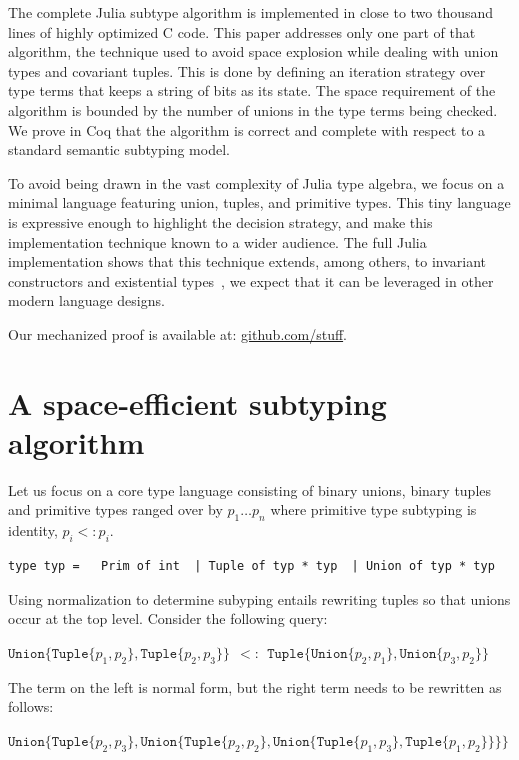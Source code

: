 \documentclass[a4paper,english]{lipics-v2019}
\newcommand{\xt}[1]{\texttt{#1}}
\newcommand{\union}[2]{\xt{Union\{}#1,#2\xt{\}}}
\newcommand{\tuple}[1]{\xt{Tuple\{}#1\xt{\}}}
\begin{document}
The complete Julia subtype algorithm is implemented in close to two thousand
lines of highly optimized C code. This paper addresses only one part of that
algorithm, the technique used to avoid space explosion while dealing with
union types and covariant tuples. This is done by defining an iteration
strategy over type terms that keeps a string of bits as its state. The space
requirement of the algorithm is bounded by the number of unions in the type
terms being checked. We prove in Coq that the algorithm is correct and
complete with respect to a standard semantic subtyping model.

To avoid being drawn in the vast complexity of Julia type algebra, we focus
on a minimal language featuring union, tuples, and primitive types. This
tiny language is expressive enough to highlight the decision strategy, and
make this implementation technique known to a wider audience.  The full
Julia implementation shows that this technique extends, among others, to
invariant constructors and existential types~\cite{DBLP:NardelliBPCBV18}, we
expect that it can be leveraged in other modern language
designs. 

\medskip
Our mechanized proof is available at: \url{github.com/stuff}.
\newpage

\section{A space-efficient subtyping algorithm}

Let us focus on a core type language consisting of binary unions, binary
tuples and primitive types ranged over by $p_1 \dots p_n$ where primitive
type subtyping is identity, $p_i <: p_i$.

\medskip
\begin{lstlisting}
type typ =   Prim of int  | Tuple of typ * typ  | Union of typ * typ
\end{lstlisting}
\medskip

\noindent
Using normalization to determine subyping entails rewriting tuples so that
unions occur at the top level. Consider the following query:

\medskip
$\union{ \tuple{p_1,p_2}}{\tuple{p_2,p_3}} ~~ <:~~  \tuple{ \union{p_2}{p_1}, \union{p_3}{p_2}}$
\medskip

\noindent
The term on the left is normal form, but the right term  needs to be
rewritten as follows:

\medskip
$\union{ \tuple{p_2,p_3}}
  {\union{ \tuple{p_2,p_2}}
    {\union{ \tuple{p_1,p_3}}
           {\tuple{p_1,p_2}}}}$
\medskip
\end{document}
